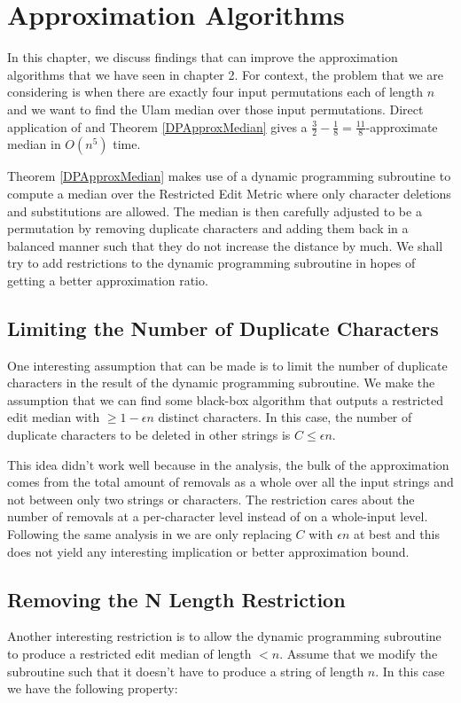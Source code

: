 \chapter{Approximation Algorithms}

In this chapter, we discuss findings that can improve the approximation algorithms that we have seen in chapter 2. For context, the problem that we are considering is when there are exactly four input permutations each of length $n$ and we want to find the Ulam median over those input permutations. Direct application of \cite{MainPaper} and Theorem \ref{DPApproxMedian} gives a $\frac{3}{2} - \frac{1}{8} = \frac{11}{8}$-approximate median in $O(n^5)$ time.

Theorem \ref{DPApproxMedian} makes use of a dynamic programming subroutine to compute a median over the Restricted Edit Metric where only character deletions and substitutions are allowed. The median is then carefully adjusted to be a permutation by removing duplicate characters and adding them back in a balanced manner such that they do not increase the distance by much. We shall try to add restrictions to the dynamic programming subroutine in hopes of getting a better approximation ratio.

\section{Limiting the Number of Duplicate Characters}
One interesting assumption that can be made is to limit the number of duplicate characters in the result of the dynamic programming subroutine.
We make the assumption that we can find some black-box algorithm that outputs a restricted edit median with $\geq 1 - \epsilon n$ distinct characters. In this case, the number of duplicate characters to be deleted in other strings is $C \leq \epsilon n$.

This idea didn't work well because in the analysis, the bulk of the approximation comes from the total amount of removals as a whole over all the input strings and not between only two strings or characters. The restriction cares about the number of removals at a per-character level instead of on a whole-input level. Following the same analysis in \cite{MainPaper} we are only replacing $C$ with $\epsilon n$ at best and this does not yield any interesting implication or better approximation bound.

\section{Removing the N Length Restriction}
Another interesting restriction is to allow the dynamic programming subroutine to produce a restricted edit median of length $< n$. Assume that we modify the subroutine such that it doesn't have to produce a string of length $n$. In this case we have the following property:

